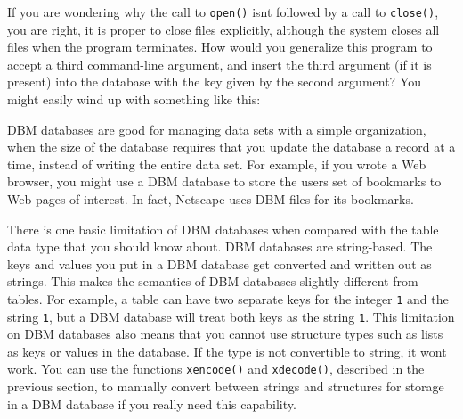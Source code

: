 
If you are wondering why the call to \texttt{open()}
isn{\textquotesingle}t followed by a call to \texttt{close()}, you are
right, it is proper to close files explicitly, although the system
closes all files when the program terminates. How would you generalize
this program to accept a third command-line argument, and insert the
third argument (if it is present) into the database with the key given
by the second argument? You might easily wind up with something like
this:


DBM databases are good for managing data sets with a simple
organization, when the size of the database requires that you update
the database a record at a time, instead of writing the entire data
set. For example, if you wrote a Web browser, you might use a DBM
database to store the user{\textquotesingle}s set of bookmarks to Web
pages of interest. In fact, Netscape uses DBM files for its bookmarks.

There is one basic limitation of DBM databases when compared with the
table data type that you should know about. DBM databases are
string-based. The keys and values you put in a DBM database get
converted and written out as strings. This makes the semantics of DBM
databases slightly different from tables. For example, a table can have
two separate keys for the integer \texttt{1} and the string
\texttt{{\textquotedbl}1{\textquotedbl}}, but a DBM database will treat
both keys as the string \texttt{{\textquotedbl}1{\textquotedbl}}. This
limitation on DBM databases also means that you cannot use structure
types such as lists as keys or values in the database. If the type is
not convertible to string, it won{\textquotesingle}t work. You can use
the functions \texttt{xencode()} and \texttt{xdecode()}, described in
the previous section, to manually convert between strings and
structures for storage in a DBM database if you really need this
capability.

